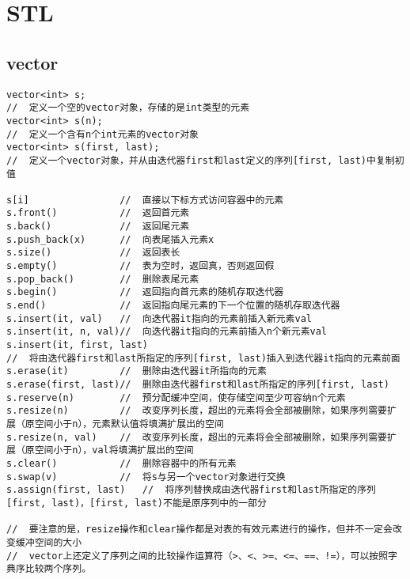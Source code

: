 \section{STL}
\subsection{vector}
\begin{lstlisting}
vector<int> s;      
//  定义一个空的vector对象，存储的是int类型的元素
vector<int> s(n);   
//  定义一个含有n个int元素的vector对象
vector<int> s(first, last); 
//  定义一个vector对象，并从由迭代器first和last定义的序列[first, last)中复制初值

s[i]                //  直接以下标方式访问容器中的元素
s.front()           //  返回首元素
s.back()            //  返回尾元素
s.push_back(x)      //  向表尾插入元素x
s.size()            //  返回表长
s.empty()           //  表为空时，返回真，否则返回假
s.pop_back()        //  删除表尾元素
s.begin()           //  返回指向首元素的随机存取迭代器
s.end()             //  返回指向尾元素的下一个位置的随机存取迭代器
s.insert(it, val)   //  向迭代器it指向的元素前插入新元素val
s.insert(it, n, val)//  向迭代器it指向的元素前插入n个新元素val
s.insert(it, first, last)   
//  将由迭代器first和last所指定的序列[first, last)插入到迭代器it指向的元素前面
s.erase(it)         //  删除由迭代器it所指向的元素
s.erase(first, last)//  删除由迭代器first和last所指定的序列[first, last)
s.reserve(n)        //  预分配缓冲空间，使存储空间至少可容纳n个元素
s.resize(n)         //  改变序列长度，超出的元素将会全部被删除，如果序列需要扩展（原空间小于n），元素默认值将填满扩展出的空间
s.resize(n, val)    //	改变序列长度，超出的元素将会全部被删除，如果序列需要扩展（原空间小于n），val将填满扩展出的空间
s.clear()           //  删除容器中的所有元素
s.swap(v)           //  将s与另一个vector对象进行交换
s.assign(first, last)	//  将序列替换成由迭代器first和last所指定的序列[first, last)，[first, last)不能是原序列中的一部分

//  要注意的是，resize操作和clear操作都是对表的有效元素进行的操作，但并不一定会改变缓冲空间的大小
//  vector上还定义了序列之间的比较操作运算符（>、<、>=、<=、==、!=），可以按照字典序比较两个序列。
\end{lstlisting}


